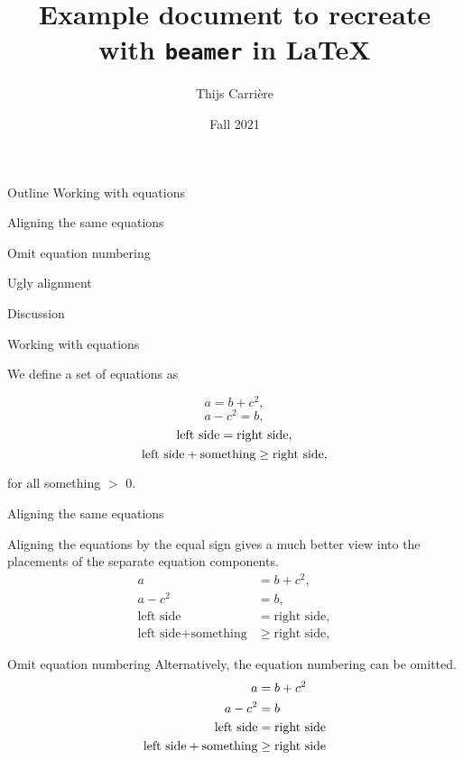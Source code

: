 \documentclass{beamer}
\title{\large{Example document to recreate with \texttt{beamer} in \LaTeX{}}}
\author{Thijs Carrière}
\date{\vspace*{-2cm}Fall 2021}
\institute{\vspace*{-3cm}Markup Languages and Reproducible Programming in Statistics}
\begin{document}
\maketitle


\begin{frame}{Outline}
Working with equations

\hspace{4mm} Aligning the same equations

\hspace{4mm} Omit equation numbering

\hspace{4mm} Ugly alignment

\vspace{1cm}
Discussion

\end{frame}

\begin{frame}{Working with equations}

We define a set of equations as


\begin{equation}
    a = b + c^2,
\end{equation}
\begin{equation}
    a - c^2 = b,
\end{equation}
\begin{equation}
    \textnormal{left side} = \textnormal{right side,}
\end{equation}
\begin{equation}
    \textnormal{left side} + \textnormal{something} \geq \textnormal{right side,}
\end{equation}

for all something $>$ 0.
\end{frame}

\begin{frame}{Aligning the same equations}

Aligning the equations by the equal sign gives a much better view into the placements
of the separate equation components.
\begin{align}
a&=b+c^2,\\
a-c^2&=b,\\
\text{left side} &= \text{right side},\\
\text{left side} + \text{something} & \geq \text{right side},
\end{align}
\end{frame}

\begin{frame}{Omit equation numbering}
Alternatively, the equation numbering can be omitted.
\begin{align*}
a&=b+c^2\\
a-c^2&=b\\
\textnormal{left side}&=\textnormal{right side}\\
\textnormal{left side}+\textnormal{something}&\geq\textnormal{right side}
\end{align*}
\end{frame}
\end{document}
